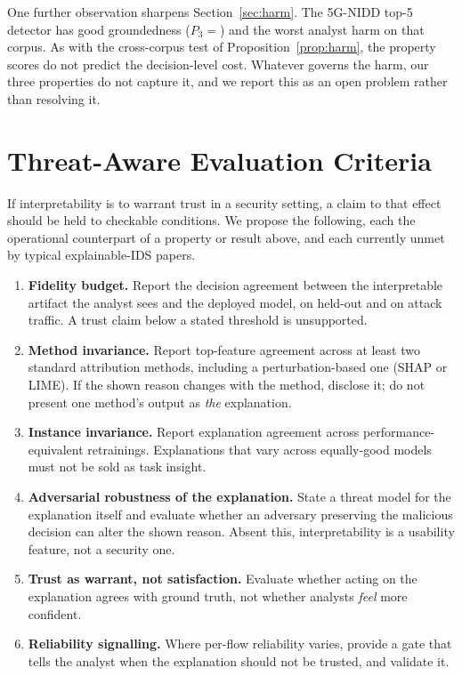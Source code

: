 \documentclass[conference]{IEEEtran}
\begin{document}
One further observation sharpens Section~\ref{sec:harm}. The 5G-NIDD top-5 detector has good
groundedness ($P_3=$) and the worst analyst harm on that corpus. As with
the cross-corpus test of Proposition~\ref{prop:harm}, the property scores do not predict the
decision-level cost. Whatever governs the harm, our three properties do not capture it, and we
report this as an open problem rather than resolving it.

\section{Threat-Aware Evaluation Criteria}\label{sec:criteria}
If interpretability is to warrant trust in a security setting, a claim to that effect should be
held to checkable conditions. We propose the following, each the operational counterpart of a
property or result above, and each currently unmet by typical explainable-IDS papers.

\begin{enumerate}
\item \textbf{Fidelity budget.} Report the decision agreement between the interpretable artifact
the analyst sees and the deployed model, on held-out and on attack traffic. A trust claim below a
stated threshold is unsupported.
\item \textbf{Method invariance.} Report top-feature agreement across at least two standard
attribution methods, including a perturbation-based one (SHAP or LIME). If the shown reason
changes with the method, disclose it; do not present one method's output as \emph{the}
explanation.
\item \textbf{Instance invariance.} Report explanation agreement across performance-equivalent
retrainings. Explanations that vary across equally-good models must not be sold as task insight.
\item \textbf{Adversarial robustness of the explanation.} State a threat model for the
explanation itself and evaluate whether an adversary preserving the malicious decision can alter
the shown reason. Absent this, interpretability is a usability feature, not a security one.
\item \textbf{Trust as warrant, not satisfaction.} Evaluate whether acting on the explanation
agrees with ground truth, not whether analysts \emph{feel} more confident.
\item \textbf{Reliability signalling.} Where per-flow reliability varies, provide a gate that
tells the analyst when the explanation should not be trusted, and validate it.
\end{enumerate}
\end{document}
